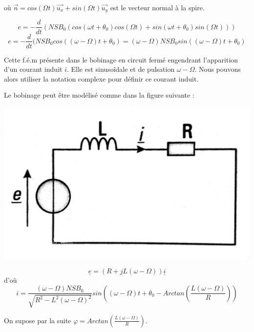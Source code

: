 \documentclass{article}
\begin{document}
où $\vec{n} = cos(\Omega t) \vec{u_x} + sin(\Omega t)\vec{u_y}$ est le vecteur normal à la spire.

\begin{equation}
    e = - \frac{d}{dt} (NSB_0 (cos(\omega t + \theta_0)cos(\Omega t) + sin(\omega t +\theta_0) sin (\Omega t)))
\end{equation}
\begin{equation}
     e = - \frac{d}{dt} (NSB_0 cos((\omega -\Omega)t + \theta_0) = (\omega - \Omega)NSB_0 sin((\omega -\Omega)t + \theta_0)
\end{equation}

Cette f.é.m présente dans le bobinage en circuit fermé engendrant l'apparition d'un courant induit $i$. Elle est sinusoîdale et de pulsation $\omega -\Omega$. Nous pouvons alors utiliser la notation complexe pour définir ce courant induit. \medskip

Le bobinage peut être modélisé comme dans la figure suivante :

\begin{center}
    \includegraphics[scale=0.1]{RLasync.jpg}
\end{center}
 
\begin{equation}
    \underline{e} = (R + jL(\omega - \Omega)) \underline{i}
\end{equation}
d'où
\begin{equation}
    i = \frac{(\omega - \Omega)NSB_0}{\sqrt{R^2-L^2(\omega - \Omega)^2}} sin\left ( (\omega - \Omega)t + \theta_0 - Arctan \left ( \frac{L (\omega - \Omega)}{R} \right ) \right )
\end{equation}

On supose par la suite $\varphi = Arctan \left ( \frac{L (\omega - \Omega)}{R} \right )$.
\end{document}
